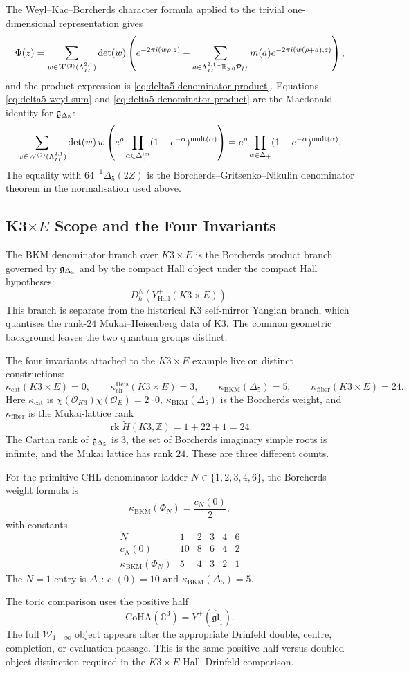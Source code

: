 The Weyl--Kac--Borcherds character formula applied to the trivial
one-dimensional representation gives
\begin{equation}
\Phi(z)=
\sum_{w\in W^{(2)}(\Lambda^{2,1}_{II})}\det(w)
\left(
e^{-2\pi i(w\rho,z)}
-
\sum_{a\in\Lambda^{2,1}_{II}\cap\mathbb{R}_{>0}\mathcal{P}_{II}}
m(a)e^{-2\pi i(w(\rho+a),z)}
\right),
\label{eq:delta5-weyl-sum}
\end{equation}
and the product expression is \eqref{eq:delta5-denominator-product}.
Equations \eqref{eq:delta5-weyl-sum} and
\eqref{eq:delta5-denominator-product} are the Macdonald identity for
$\mathfrak{g}_{\Delta_5}$:
\[
\sum_{w\in W^{(2)}(\Lambda^{2,1}_{II})}\det(w)\,
w\left(
e^\rho
\prod_{\alpha\in\Delta^{\mathrm{im}}_+}
(1-e^{-\alpha})^{\mathrm{mult}(\alpha)}
\right)
=
e^\rho
\prod_{\alpha\in\Delta_+}(1-e^{-\alpha})^{\mathrm{mult}(\alpha)}.
\]
The equality with $64^{-1}\Delta_5(2Z)$ is the
Borcherds--Gritsenko--Nikulin denominator theorem in the normalisation
used above.

\subsection*{K3$\times E$ Scope and the Four Invariants}

The BKM denominator branch over $K3\times E$ is the Borcherds product
branch governed by $\mathfrak{g}_{\Delta_5}$ and by the compact Hall object under the compact
Hall hypotheses:
\[
D^\wedge_\hbar\!\left(Y^+_{\mathrm{Hall}}(K3\times E)\right).
\]
This branch is separate from the historical K3 self-mirror Yangian branch,
which quantises the rank-$24$ Mukai--Heisenberg data of K3.  The common
geometric background leaves the two quantum groups distinct.

The four invariants attached to the $K3\times E$ example live on distinct
constructions:
\[
\kappa_{\mathrm{cat}}(K3\times E)=0,\qquad
\kappa_{\mathrm{ch}}^{\mathrm{Heis}}(K3\times E)=3,\qquad
\kappa_{\mathrm{BKM}}(\Delta_5)=5,\qquad
\kappa_{\mathrm{fiber}}(K3\times E)=24.
\]
Here $\kappa_{\mathrm{cat}}$ is $\chi(\mathcal{O}_{K3})\chi(\mathcal{O}_E)=2\cdot0$,
$\kappa_{\mathrm{BKM}}(\Delta_5)$ is the Borcherds weight, and
$\kappa_{\mathrm{fiber}}$ is the Mukai-lattice rank
\[
\operatorname{rk}\widetilde H(K3,\mathbb{Z})=1+22+1=24.
\]
The Cartan rank of $\mathfrak{g}_{\Delta_5}$ is $3$, the set of Borcherds imaginary simple
roots is infinite, and the Mukai lattice has rank $24$.  These are three
different counts.

For the primitive CHL denominator ladder
$N\in\{1,2,3,4,6\}$, the Borcherds weight formula is
\[
\kappa_{\mathrm{BKM}}(\Phi_N)=\frac{c_N(0)}2,
\]
with constants
\[
\begin{array}{c|ccccc}
N&1&2&3&4&6\\
\hline
c_N(0)&10&8&6&4&2\\
\kappa_{\mathrm{BKM}}(\Phi_N)&5&4&3&2&1
\end{array}
\]
The $N=1$ entry is $\Delta_5$: $c_1(0)=10$ and
$\kappa_{\mathrm{BKM}}(\Delta_5)=5$.

The toric comparison uses the positive half
\[
\mathrm{CoHA}(\mathbb{C}^3)=Y^+(\widehat{\mathfrak{gl}}_1).
\]
The full $\mathcal{W}_{1+\infty}$ object appears after the appropriate
Drinfeld double, centre, completion, or evaluation passage.  This is the
same positive-half versus doubled-object distinction required in the
$K3\times E$ Hall--Drinfeld comparison.

